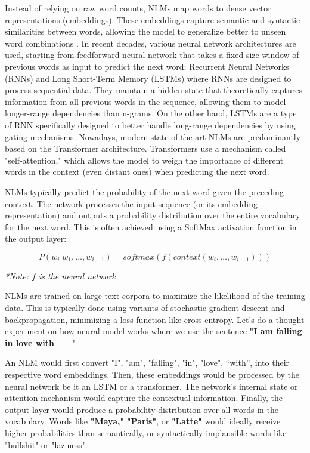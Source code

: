 Instead of relying on raw word counts, NLMs map words to dense vector representations (embeddings). These embeddings capture semantic and syntactic similarities between words, allowing the model to generalize better to unseen word combinations \parencite{bengio_neural_2003}. In recent decades, various neural network architectures are used, starting from feedforward neural network that takes a fixed-size window of previous words as input to predict the next word; Recurrent Neural Networks (RNNs) and Long Short-Term Memory (LSTMs) where RNNs are designed to process sequential data. They maintain a hidden state that theoretically captures information from all previous words in the sequence, allowing them to model longer-range dependencies than n-grams. On the other hand, LSTMs are a type of RNN specifically designed to better handle long-range dependencies by using gating mechanisms. Nowadays, modern state-of-the-art NLMs are predominantly based on the Transformer architecture. Transformers use a mechanism called "self-attention," which allows the model to weigh the importance of different words in the context (even distant ones) when predicting the next word.

NLMs typically predict the probability of the next word given the preceding context. The network processes the input sequence (or its embedding representation) and outputs a probability distribution over the entire vocabulary for the next word. This is often achieved using a SoftMax activation function in the output layer:

$$P(w_i|w_1,\ldots,w_{i-1} )=softmax(f(context(w_i,\ldots,w_{i-1} )))$$

\textit{*Note: $f$ is the neural network}

NLMs are trained on large text corpora to maximize the likelihood of the training data. This is typically done using variants of stochastic gradient descent and backpropagation, minimizing a loss function like cross-entropy. Let's do a thought experiment on how neural model works where we use the sentence \textbf{"I am falling in love with \_\_"}:

An NLM would first convert "I", "am", "falling", "in", "love", “with”, into their respective word embeddings. Then, these embeddings would be processed by the neural network be it an LSTM or a transformer. The network's internal state or attention mechanism would capture the contextual information. Finally, the output layer would produce a probability distribution over all words in the vocabulary. Words like \textbf{"Maya,"} \textbf{"Paris"}, or \textbf{"Latte"} would ideally receive higher probabilities than semantically, or syntactically implausible words like "bullshit" or "laziness".
